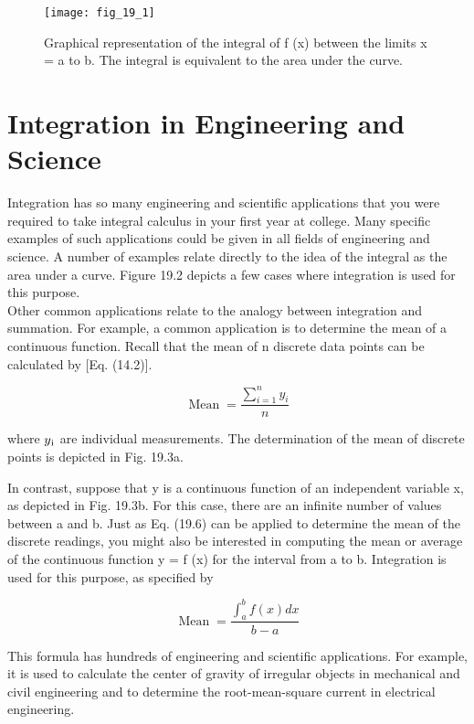 \documentclass[../main.tex]{subfiles}
\begin{document}
\begin{figure}[H]
    \centering
    \texttt{[image: fig\_19\_1]}
   \caption{\textsf{Graphical representation of the integral of f (x) between the limits x = a to b. The integral is
   equivalent to the area under the curve.}}\label{fig:fig_19_1}
\end{figure}

\section{Integration in Engineering and Science}
Integration has so many engineering and scientific applications that you were required to
take integral calculus in your first year at college. Many specific examples of such applications could be given in all fields of engineering and science. A number of examples relate directly to the idea of the integral as the area under a curve. Figure 19.2 depicts a few
cases where integration is used for this purpose.\\

Other common applications relate to the analogy between integration and summation.
For example, a common application is to determine the mean of a continuous function.
Recall that the mean of n discrete data points can be calculated by [Eq. (14.2)].

\begin{equation}
    \tag{19.6}
	\operatorname{Mean}=\frac{\sum_{i=1}^{n} y_{i}}{n}
	\end{equation}

	where $y\textsubscript{i}$ are individual measurements. The determination of the mean of discrete points is
	depicted in Fig. 19.3a.

	In contrast, suppose that y is a continuous function of an independent variable x, as
	depicted in Fig. 19.3b. For this case, there are an infinite number of values between a and
	b. Just as Eq. (19.6) can be applied to determine the mean of the discrete readings,
	you might also be interested in computing the mean or average of the continuous function
	y = f (x) for the interval from a to b. Integration is used for this purpose, as specified by 

	\begin{equation}
		\tag{19.7}
		\operatorname{Mean}=\frac{\int_{a}^{b} f(x) d x}{b-a}
		\end{equation}

		This formula has hundreds of engineering and scientific applications. For example, it is
		used to calculate the center of gravity of irregular objects in mechanical and civil engineering and to determine the root-mean-square current in electrical engineering.
\end{document}
